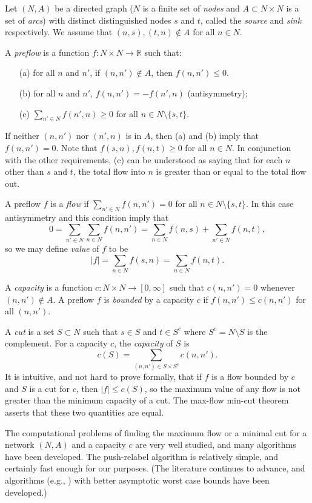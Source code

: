 \documentclass[12pt]{article}
\theoremstyle{definition}
\renewcommand{\Re}{\mathbb{R}}
\begin{document}
\begin{appendix}
Let $(N,A)$ be a directed graph ($N$ is a finite set of \emph{nodes}
and $A \subset N \times N$ is a set of \emph{arcs}) with distinct
distinguished nodes $s$ and $t$, called the \emph{source} and
\emph{sink} respectively.  We assume that $(n,s), (t, n) \notin A$ for
all $n \in N$.

A \emph{preflow} is a function $f \colon N \times N \to \Re$ such that:
\begin{enumerate}
  \item[(a)] for all $n$ and $n'$,  if $(n,n') \notin A$, then $f(n,n') \le 0$.
  \item[(b)] for all $n$ and $n'$,  $f(n,n') = - f(n',n)$ (antisymmetry); 
  \item[(c)] $\sum_{n' \in N} f(n',n) \ge 0$ for all $n \in N \setminus \{s,t\}$. 
\end{enumerate}
If neither $(n,n')$ nor $(n',n)$ is in $A$, then (a) and (b) imply
that $f(n,n') = 0$.  Note that $f(s,n), f(n,t) \ge 0$ for all $n \in
N$.  In conjunction with the other requirements, (c) can be understood
as saying that for each $n$ other than $s$ and $t$, the total flow
into $n$ is greater than or equal to the total flow out.

A preflow $f$ is a \emph{flow} if $\sum_{n' \in N} f(n,n') = 0$ for
all $n \in N \setminus \{s,t\}$.  In this case antisymmetry and this
condition imply that
$$0 = \sum_{n' \in N}\sum_{n \in N} f(n,n') = \sum_{n \in N} f(n,s) + \sum_{n' \in N} f(n,t),$$
so we may define \emph{value} of $f$ to be
$$|f| = \sum_{n \in N} f(s,n) = \sum_{n \in N} f(n,t).$$

A \emph{capacity} is a function $c \colon N \times N \to [0,\infty]$
such that $c(n,n') = 0$ whenever $(n,n') \notin A$.  A preflow $f$ is
\emph{bounded} by a capacity $c$ if $f(n,n') \le c(n,n')$ for all
$(n,n')$.

A \emph{cut} is a
set $S \subset N$ such that $s \in S$ and $t \in S^c$ where $S^c = N
\setminus S$ is the complement.  For a capacity $c$, the
\emph{capacity} of $S$ is
$$c(S) = \sum_{(n,n') \in S \times S^c} c(n,n').$$ It is intuitive,
and not hard to prove formally, that if $f$ is a flow bounded by $c$
and $S$ is a cut for $c$, then $|f| \le c(S)$, so the maximum value of
any flow is not greater than the minimum capacity of a cut.  The
max-flow min-cut theorem \citep{FoFu56} asserts that these two
quantities are equal.

The computational problems of finding the maximum flow or a minimal
cut for a network $(N,A)$ and a capacity $c$ are very well studied,
and many algorithms have been developed.  The push-relabel algorithm
is relatively simple, and certainly fast enough for our purposes.
(The literature continues to advance, and algorithms (e.g.,
\cite{CKLGS22}) with better asymptotic worst case bounds have been
developed.)
  

\end{appendix}
\end{document}
